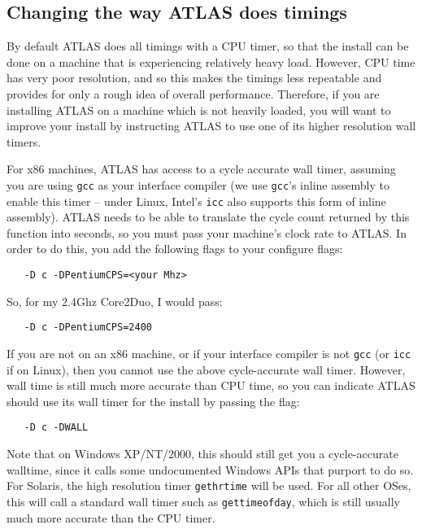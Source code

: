 \documentclass[11pt]{article}
\begin{document}
\subsection{Changing the way ATLAS does timings}
\label{sec-time-flags}

By default ATLAS does all timings with a CPU timer, so that the install
can be done on a machine that is experiencing relatively heavy load.  However,
CPU time has very poor resolution, and so this makes the timings less repeatable
and provides for only a rough idea of overall performance.  Therefore, if
you are installing ATLAS on a machine which is not heavily loaded, you will
want to improve your install by instructing ATLAS to use one of its higher
resolution wall timers.

For x86 machines, ATLAS has access to a cycle accurate wall timer, assuming
you are using {\tt gcc} as your interface compiler (we use {\tt gcc}'s inline
assembly to enable this timer -- under Linux, Intel's {\tt icc} also supports
this form of inline
assembly).  ATLAS needs to be able to translate the cycle count returned by
this function into seconds, so you must pass your machine's clock rate to
ATLAS.  In order to do this, you add the following flags to your 
configure flags:
\vspace*{-0.1in}
\begin{verbatim}
   -D c -DPentiumCPS=<your Mhz>
\end{verbatim}
So, for my 2.4Ghz Core2Duo, I would pass:
\vspace*{-0.1in}
\begin{verbatim}
   -D c -DPentiumCPS=2400
\end{verbatim}

If you are not on an x86 machine, or if your interface compiler is not {\tt gcc}
(or {\tt icc} if on Linux), then you cannot use the above cycle-accurate
wall timer.  However, wall time is still much more accurate than CPU time,
so you can indicate ATLAS should use its wall timer for the install by passing
the flag:
\vspace*{-0.1in}
\begin{verbatim}
   -D c -DWALL
\end{verbatim}

Note that on Windows XP/NT/2000, this should still get you a cycle-accurate
walltime, since it calls some undocumented Windows APIs that purport to do so. 
For Solaris, the high resolution timer {\tt gethrtime} will be used.  For
all other OSes, this will call a standard wall timer such as {\tt gettimeofday},
which is still usually much more accurate than the CPU timer.
\end{document}
